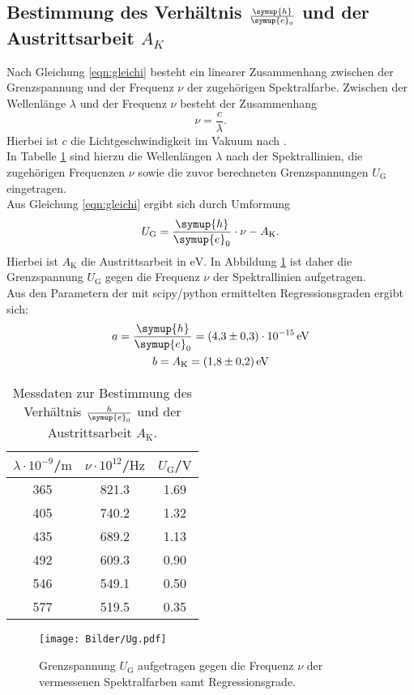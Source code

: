 \subsection{Bestimmung des Verhältnis $\frac{\symup{h}}{\symup{e}_0}$ und der Austrittsarbeit $A_{K}$}
Nach Gleichung \eqref{eqn:gleichi} besteht ein linearer Zusammenhang zwischen der Grenzspannung und der Frequenz $\nu$ der zugehörigen Spektralfarbe.
Zwischen der Wellenlänge $\lambda$ und der Frequenz $\nu$ besteht der Zusammenhang
\begin{equation*}
  \nu=\frac{c}{\lambda} \text{.}
\end{equation*}
Hierbei ist $c$ die Lichtgeschwindigkeit im Vakuum nach \cite{c}.\\
In Tabelle \ref{tab:ak} sind hierzu die Wellenlängen $\lambda$ nach \cite{Anleitung} der Spektrallinien, die zugehörigen Frequenzen $\nu$ sowie die zuvor berechneten Grenzspannungen $U_\mathrm{G}$ eingetragen.\\
Aus Gleichung \eqref{eqn:gleichi} ergibt sich durch Umformung
\begin{equation*}
  U_\mathrm{G}=\frac{\symup{h}}{\symup{e}_0} \cdot{\nu}-A_\mathrm{K} \text{.}
\end{equation*}
Hierbei ist $A_\mathrm{K}$ die Austrittsarbeit in $\si{\electronvolt}$.
In Abbildung \ref{fig:ak} ist daher die Grenzspannung $U_\mathrm{G}$ gegen die Frequenz $\nu$ der Spektrallinien aufgetragen.\\
Aus den Parametern der mit scipy/python \cite{scipy} ermittelten Regressionsgraden ergibt sich:
\begin{gather*}
  a=\frac{\symup{h}}{\symup{e}_0}= \SI{4.3(3)e-15}{\electronvolt}\\
b=A_\mathrm{K}=\SI{1.8(2)}{\electronvolt}
\end{gather*}


\begin{table}
  \centering
\caption{Messdaten zur Bestimmung des Verhältnis $\frac{h}{\symup{e}_0}$ und der Austrittsarbeit $A_\mathrm{K}$.}
\label{tab:ak}
\begin{tabular}{ccc}
  \toprule
$\lambda \cdot 10^{-9}$/$\si{\meter}$& $\nu \cdot 10^{12}$/$\si{\hertz}$ & $U_\mathrm{G}$/$\si{\volt}$ \\
\midrule
365 & 821.3 & 1.69 \\
405 & 740.2 & 1.32 \\
435 & 689.2 & 1.13 \\
492 & 609.3 & 0.90 \\
546 & 549.1 & 0.50 \\
577 & 519.5 & 0.35 \\
\bottomrule
\end{tabular}
\end{table}
\begin{figure}
  \centering
  \caption{Grenzspannung $U_\mathrm{G}$ aufgetragen gegen die Frequenz $\nu$ der vermessenen Spektralfarben samt Regressionsgrade.}
  \label{fig:ak}
  \texttt{[image: Bilder/Ug.pdf]}
\end{figure}
